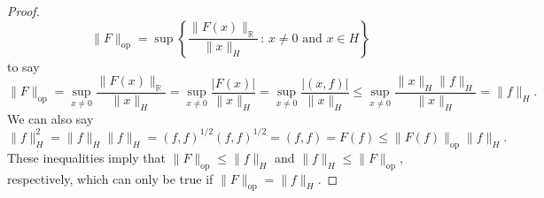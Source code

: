 \documentclass[11pt]{article}
\theoremstyle{definition}
\begin{document}
\begin{proof}
	\begin{equation*}
		\|F\|_{\text{op}} = \sup\left\{\frac{\|F(x)\|_{\mathbb{R}}}{\|x\|_H}\, : \, x \not= 0 \text{ and } x \in H\right\}
	\end{equation*}
	to say
	\begin{equation*}
		\|F\|_{\text{op}} = \sup_{x\not=0}{\frac{\|F(x)\|_{\mathbb{R}}}{\|x\|_H}} = \sup_{x\not=0}{\frac{|F(x)|}{\|x\|_H}} = \sup_{x\not=0}{\frac{|(x,f)|}{\|x\|_H}} \leq \sup_{x\not=0}{\frac{\|x\|_H\|f\|_H}{\|x\|_H}} = \|f\|_H.
	\end{equation*}
	We can also say
	\begin{equation*}
		\|f\|_H^2 = \|f\|_H\|f\|_H = (f,f)^{1/2}(f,f)^{1/2} = (f,f) = F(f) \leq \|F(f)\|_{\text{op}}\|f\|_H.
	\end{equation*}
	These inequalities imply that $\|F\|_{\text{op}} \leq \|f\|_H$ and $\|f\|_H \leq \|F\|_{\text{op}}$, respectively, which can only be true if $\|F\|_{\text{op}} = \|f\|_H$.
\end{proof}
\end{document}
